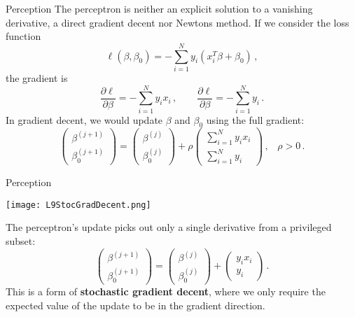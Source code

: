 \documentclass[10pt, table, dvipsnames,xcdraw, handout]{beamer}
\begin{document}
\begin{frame}[fragile]{Perception}
The perceptron is neither an explicit solution to a vanishing derivative, a direct gradient decent nor Newtons method. \pause If we consider the loss function
$$
\ell(\beta,\beta_0) = -\sum_{i=1}^N y_i(x_i^T\beta + \beta_0)\,,
$$\pause
the gradient is
$$
\frac{\partial\ell}{\partial \beta} = -\sum_{i=1}^N y_ix_i\,,\hspace{2em} \frac{\partial\ell}{\partial \beta} = -\sum_{i=1}^N y_i\,.
$$\pause
In gradient decent, we would update $\beta$ and $\beta_0$ using the full gradient:
$$
\left(
\begin{matrix}
\beta^{(j+1)}
\\
\beta_0^{(j+1)}
\end{matrix}
\right)
=
\left(
\begin{matrix}
\beta^{(j)}
\\
\beta_0^{(j)}
\end{matrix}
\right)
+\rho
\left(
\begin{matrix}
\sum_{i=1}^N y_ix_i
\\
\sum_{i=1}^N y_i
\end{matrix}
\right)\,,\,\,\,\,\,\rho>0\,.
$$
\end{frame}



\begin{frame}[fragile]{Perception}
  \begin{minipage}[t][0.5\textheight][t]{\textwidth}
	\centering \texttt{[image: L9StocGradDecent.png]} 
  \end{minipage}
  \vfill
\begin{minipage}[t][0.5\textheight][t]{\textwidth}
The perceptron's update picks out only a single derivative from a privileged subset:
$$
\left(
\begin{matrix}
\beta^{(j+1)}
\\
\beta_0^{(j+1)}
\end{matrix}
\right)
=
\left(
\begin{matrix}
\beta^{(j)}
\\
\beta_0^{(j)}
\end{matrix}
\right)
+
\left(
\begin{matrix}
y_ix_i
\\
y_i
\end{matrix}
\right)\,.
$$\pause
This is a form of \textbf{stochastic gradient decent}, where we only require the expected value of the update to be in the gradient direction. 
\end{minipage}
\end{frame}
\end{document}

